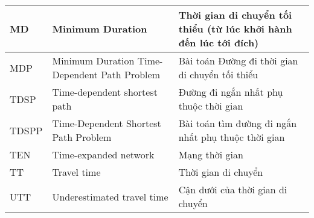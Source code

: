 \documentclass[fontsize=14pt,DIV=15pt,twoside=false]{scrbook}
\renewcommand{\baselinestretch}{1.3}
\newcommand{\toc}[0]{
\renewcommand{\baselinestretch}{1.0}
\tableofcontents
\renewcommand{\baselinestretch}{1.2}
\listoffigures
\listoftables
\listofalgorithms
\renewcommand{\baselinestretch}{1.3}
}
\begin{document}
\begin{table}[h]
\begin{tabularx}{\textwidth}{|p{1.5cm}|X|X|}
    MD               & Minimum Duration                                  & Thời gian di chuyển tối thiểu (từ lúc khởi hành đến lúc tới đích)                   \\ \midrule
    MDP              & Minimum Duration Time-Dependent Path Problem      & Bài toán Đường đi thời gian di chuyển tối thiểu                                     \\ \midrule
    TDSP             & Time-dependent shortest path                      & Đường đi ngắn nhất phụ thuộc thời gian                                              \\ \midrule
    TDSPP            & Time-Dependent Shortest Path Problem              & Bài toán tìm đường đi ngắn nhất phụ thuộc thời gian                                 \\ \midrule
    TEN              & Time-expanded network                             & Mạng thời gian                                                                      \\ \midrule
    TT               & Travel time                                       & Thời gian di chuyển                                                                 \\ \midrule
    UTT              & Underestimated travel time                        & Cận dưới của thời gian di chuyển                                                    \\ \bottomrule
    \end{tabularx}
\end{table}

\toc

%
%
%



\printbibliography
%

\backmatter
\end{document}
